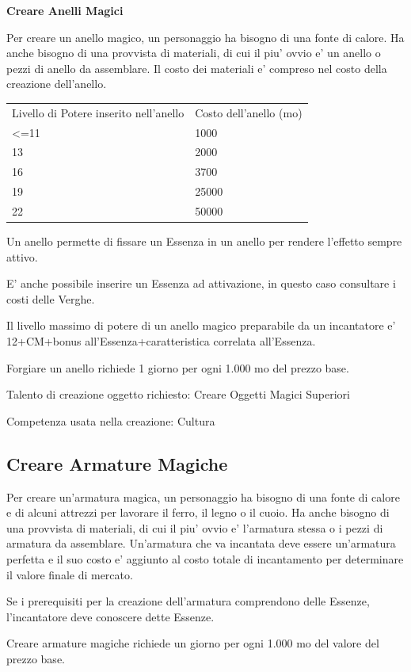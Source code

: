 \documentclass[a4paper,11pt,twoside,openany]{dndbook}
\begin{document}
{\textbf{Creare Anelli Magici}

Per creare un anello magico, un personaggio ha bisogno di una fonte di calore. Ha anche bisogno di una provvista di materiali, di cui il piu' ovvio e' un anello o pezzi di anello da assemblare. Il costo dei materiali e' compreso nel costo della creazione dell'anello.

\bigskip

\begin{tabular}[c]{@{}ll@{}}
\toprule 
Livello di Potere inserito nell'anello & Costo dell'anello (mo)\tabularnewline
\textless=11 & 1000\tabularnewline
13 & 2000\tabularnewline
16 & 3700\tabularnewline
19 & 25000\tabularnewline
22 & 50000\tabularnewline
\bottomrule
\end{tabular}

\bigskip

Un anello permette di fissare un Essenza in un anello per rendere l'effetto sempre attivo.

E' anche possibile inserire un Essenza ad attivazione, in questo caso consultare i costi delle Verghe.

Il livello massimo di potere di un anello magico preparabile da un incantatore e' 12+CM+bonus all'Essenza+caratteristica correlata all'Essenza.

Forgiare un anello richiede 1 giorno per ogni 1.000 mo del prezzo base.

Talento di creazione oggetto richiesto: Creare Oggetti Magici Superiori

Competenza usata nella creazione: Cultura

\subsection{Creare Armature Magiche}

Per creare un'armatura magica, un personaggio ha bisogno di una fonte di calore e di alcuni attrezzi per lavorare il ferro, il legno o il cuoio. Ha anche bisogno di una provvista di materiali, di cui il piu' ovvio e' l'armatura stessa o i pezzi di armatura da assemblare. Un'armatura che va incantata deve essere un'armatura perfetta e il suo costo e' aggiunto al costo totale di incantamento per determinare il valore finale di mercato.

Se i prerequisiti per la creazione dell'armatura comprendono delle Essenze, l'incantatore deve conoscere dette Essenze. 

Creare armature magiche richiede un giorno per ogni 1.000 mo del valore
del prezzo base.

}
\end{document}
